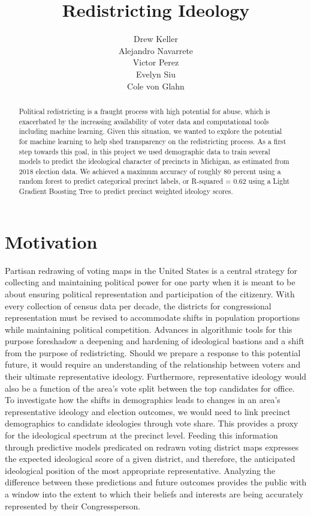 \documentclass{article}
\title{Redistricting Ideology}
\author{%
  Drew Keller \\
  \And
  Alejandro Navarrete \\
  \And
  Victor Perez\\
  \And
  Evelyn Siu \\
  \And
  Cole von Glahn
}
\begin{document}
\maketitle


\begin{abstract}
    Political redistricting is a fraught process with high potential for abuse, which is exacerbated by the increasing availability of voter data and computational tools including machine learning. Given this situation, we wanted to explore the potential for machine learning to help shed transparency on the redistricting process. As a first step towards this goal, in this project we used demographic data to train several models to predict the ideological character of precincts in Michigan, as estimated from 2018 election data. We achieved a maximum accuracy of roughly 80 percent using a random forest to predict categorical precinct labels, or R-squared = 0.62 using a Light Gradient Boosting Tree to predict precinct weighted ideology scores.

\end{abstract}


\section{Motivation}


  Partisan redrawing of voting maps in the United States is a central strategy for collecting and 
  maintaining political power for one party when it is meant to be about ensuring political representation and participation of the citizenry.
  With every collection of census data per decade, the districts for congressional representation must be revised to accommodate shifts in population proportions while maintaining political competition. 
  Advances in algorithmic tools for this purpose foreshadow a 
  deepening and hardening of ideological bastions and a shift from the purpose of redistricting. 
  Should we prepare a response to this potential future, it would require an understanding of the relationship between voters and their ultimate representative ideology.
  Furthermore, representative ideology would also be a function of the area's vote split between the top candidates for office. 
  To investigate how the shifts in demographics leads to changes in an area's representative ideology and election outcomes, we would need to link precinct demographics to candidate ideologies through vote share. This provides a proxy for the 
  ideological spectrum at the precinct level. Feeding this information through predictive models
  predicated on redrawn voting district maps expresses the expected ideological score of a given
  district, and therefore, the anticipated ideological position of the most appropriate representative.
  Analyzing the difference between these predictions and future outcomes provides the public with a window 
  into the extent to which their beliefs and interests are being accurately represented by their
  Congressperson.
  
\end{document}
